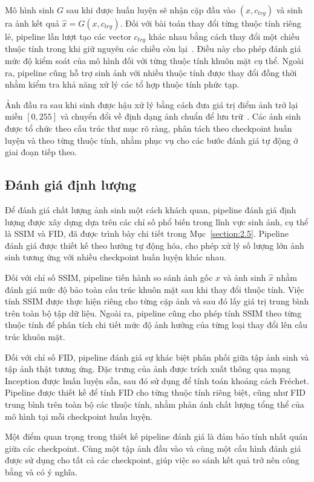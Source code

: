 \documentclass[../DoAn.tex]{subfiles}
\begin{document}
Mô hình sinh $G$ sau khi được huấn luyện sẽ nhận cặp đầu vào $(x, c_{trg})$ và sinh ra ảnh kết quả $\hat{x} = G(x, c_{trg})$. Đối với bài toán thay đổi từng thuộc tính riêng lẻ, pipeline lần lượt tạo các vector $c_{trg}$ khác nhau bằng cách thay đổi một chiều thuộc tính trong khi giữ nguyên các chiều còn lại~\cite{Choi2018StarGAN}. Điều này cho phép đánh giá mức độ kiểm soát của mô hình đối với từng thuộc tính khuôn mặt cụ thể. Ngoài ra, pipeline cũng hỗ trợ sinh ảnh với nhiều thuộc tính được thay đổi đồng thời nhằm kiểm tra khả năng xử lý các tổ hợp thuộc tính phức tạp.

Ảnh đầu ra sau khi sinh được hậu xử lý bằng cách đưa giá trị điểm ảnh trở lại miền $[0,255]$ và chuyển đổi về định dạng ảnh chuẩn để lưu trữ~\cite{Choi2018StarGAN}. Các ảnh sinh được tổ chức theo cấu trúc thư mục rõ ràng, phân tách theo checkpoint huấn luyện và theo từng thuộc tính, nhằm phục vụ cho các bước đánh giá tự động ở giai đoạn tiếp theo.

\subsection{Đánh giá định lượng}

Để đánh giá chất lượng ảnh sinh một cách khách quan, pipeline đánh giá định lượng được xây dựng dựa trên các chỉ số phổ biến trong lĩnh vực sinh ảnh, cụ thể là SSIM và FID, đã được trình bày chi tiết trong Mục~\ref{section:2.5}. Pipeline đánh giá được thiết kế theo hướng tự động hóa, cho phép xử lý số lượng lớn ảnh sinh tương ứng với nhiều checkpoint huấn luyện khác nhau.

Đối với chỉ số SSIM, pipeline tiến hành so sánh ảnh gốc $x$ và ảnh sinh $\hat{x}$ nhằm đánh giá mức độ bảo toàn cấu trúc khuôn mặt sau khi thay đổi thuộc tính. Việc tính SSIM được thực hiện riêng cho từng cặp ảnh và sau đó lấy giá trị trung bình trên toàn bộ tập dữ liệu. Ngoài ra, pipeline cũng cho phép tính SSIM theo từng thuộc tính để phân tích chi tiết mức độ ảnh hưởng của từng loại thay đổi lên cấu trúc khuôn mặt.

Đối với chỉ số FID, pipeline đánh giá sự khác biệt phân phối giữa tập ảnh sinh và tập ảnh thật tương ứng. Đặc trưng của ảnh được trích xuất thông qua mạng Inception được huấn luyện sẵn, sau đó sử dụng để tính toán khoảng cách Fréchet. Pipeline được thiết kế để tính FID cho từng thuộc tính riêng biệt, cũng như FID trung bình trên toàn bộ các thuộc tính, nhằm phản ánh chất lượng tổng thể của mô hình tại mỗi checkpoint huấn luyện.

Một điểm quan trọng trong thiết kế pipeline đánh giá là đảm bảo tính nhất quán giữa các checkpoint. Cùng một tập ảnh đầu vào và cùng một cấu hình đánh giá được sử dụng cho tất cả các checkpoint, giúp việc so sánh kết quả trở nên công bằng và có ý nghĩa.
\end{document}
